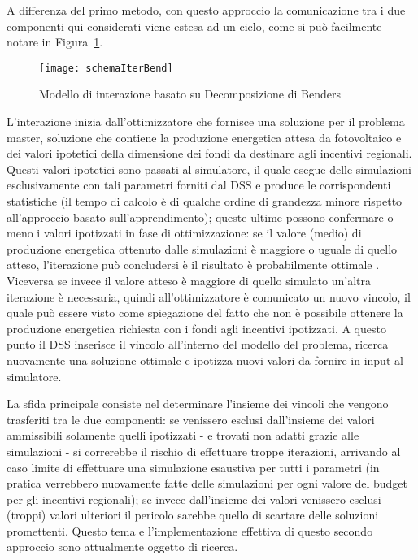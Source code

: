 A differenza del primo metodo, con questo approccio la comunicazione tra i due componenti qui considerati viene estesa ad un ciclo, come si può facilmente notare in Figura~\ref{schemaIterBend}.

\begin{figure}[htb]
	\begin{center}
	\texttt{[image: schemaIterBend]}
	\end{center}
	\caption{Modello di interazione basato su Decomposizione di Benders}
  	\label{schemaIterBend}
\end{figure}

L'interazione inizia dall'ottimizzatore che fornisce una soluzione per il problema master, soluzione che contiene la produzione energetica attesa da fotovoltaico e dei valori ipotetici della dimensione dei fondi da destinare agli incentivi regionali. Questi valori ipotetici sono passati al simulatore, il quale esegue delle simulazioni esclusivamente con tali parametri forniti dal DSS e produce le corrispondenti statistiche (il tempo di calcolo è di qualche ordine di grandezza minore rispetto all'approccio basato sull'apprendimento); queste ultime possono confermare o meno i valori ipotizzati in fase di ottimizzazione: se il valore (medio) di produzione energetica ottenuto dalle simulazioni è maggiore o uguale di quello atteso, l'iterazione può concludersi è il risultato è probabilmente ottimale \cite{bendersDec}. Viceversa se invece il valore atteso è maggiore di quello simulato un'altra iterazione è necessaria, quindi  all'ottimizzatore è comunicato un nuovo vincolo, il quale può essere visto come spiegazione del fatto che non è possibile ottenere la produzione energetica richiesta con i fondi agli incentivi ipotizzati. A questo punto il DSS inserisce il vincolo all'interno del modello del problema, ricerca nuovamente una soluzione ottimale e ipotizza nuovi valori da fornire in input al simulatore.

La sfida principale consiste nel determinare l'insieme dei vincoli che vengono trasferiti tra le due componenti: se venissero esclusi dall'insieme dei valori ammissibili solamente quelli ipotizzati - e trovati non adatti grazie alle simulazioni - si correrebbe il rischio di effettuare troppe iterazioni, arrivando al caso limite di effettuare una simulazione esaustiva per tutti i parametri (in pratica verrebbero nuovamente fatte delle simulazioni per ogni valore del budget per gli incentivi regionali); se invece dall'insieme dei valori  venissero esclusi (troppi) valori ulteriori il pericolo sarebbe quello di scartare delle soluzioni promettenti. Questo tema e l'implementazione effettiva di questo secondo approccio sono attualmente oggetto di ricerca.

